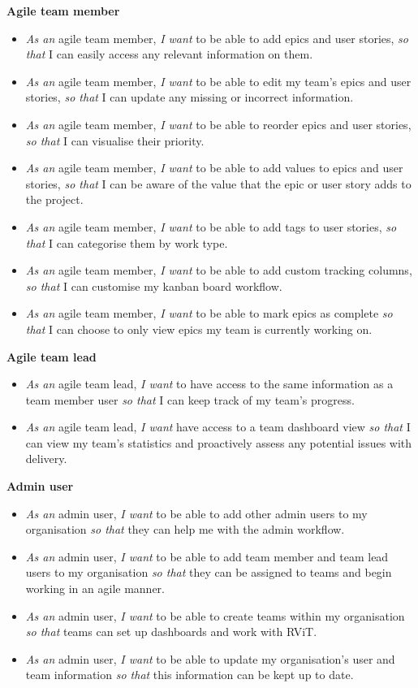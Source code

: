 \documentclass[l4proj.tex]{subfiles}
\begin{document}
\textbf{Agile team member}
\begin{itemize}
    \item \textit{As an} agile team member, \textit{I want} to be able to add epics and user stories, \textit{so that} I can easily access any relevant information on them.
    \item \textit{As an} agile team member, \textit{I want} to be able to edit my team's epics and user stories, \textit{so that} I can update any missing or incorrect information.
    \item \textit{As an} agile team member, \textit{I want} to be able to reorder epics and user stories, \textit{so that} I can visualise their priority.
    \item \textit{As an} agile team member, \textit{I want} to be able to add values to epics and user stories, \textit{so that} I can be aware of the value that the epic or user story adds to the project.
    \item \textit{As an} agile team member, \textit{I want} to be able to add tags to user stories, \textit{so that} I can categorise them by work type.
    \item \textit{As an} agile team member, \textit{I want} to be able to add custom tracking columns, \textit{so that} I can customise my kanban board workflow.
    \item \textit{As an} agile team member, \textit{I want} to be able to mark epics as complete \textit{so that} I can choose to only view epics my team is currently working on.
\end{itemize}

\textbf{Agile team lead}
\begin{itemize}
    \item \textit{As an} agile team lead, \textit{I want} to have access to the same information as a team member user \textit{so that} I can keep track of my team's progress.
    \item \textit{As an} agile team lead, \textit{I want} have access to a team dashboard view \textit{so that} I can view my team's statistics and proactively assess any potential issues with delivery.
\end{itemize}
    
\textbf{Admin user}
\begin{itemize}
    \item \textit{As an} admin user, \textit{I want} to be able to add other admin users to my organisation \textit{so that} they can help me with the admin workflow.
    \item \textit{As an} admin user, \textit{I want} to be able to add team member and team lead users to my organisation \textit{so that} they can be assigned to teams and begin working in an agile manner.
    \item \textit{As an} admin user, \textit{I want} to be able to create teams within my organisation \textit{so that} teams can set up dashboards and work with RViT.
    \item \textit{As an} admin user, \textit{I want} to be able to update my organisation's user and team information \textit{so that} this information can be kept up to date.
\end{itemize}
\end{document}
